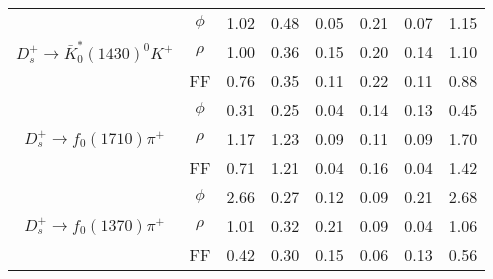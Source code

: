 \documentclass[aps,prd,twocolumn,showpacs,amsmath,amssymb]{revtex4-1}
\begin{document}
\begin{table*}[tp]
\begin{tabular}{cccccccc}
            \hline                                                                                                                                         
            \multirow{3}{*}{$D_{s}^{+} \rightarrow \bar{K}^{*}_{0}(1430)^{0}K^{+}$}     & $\phi$        &1.02      &0.48       &0.05   &0.21  &0.07  &1.15     \\
                                                                                        & $\rho$        &1.00      &0.36       &0.15   &0.20  &0.14  &1.10 \\
                                                                                        & FF            &0.76      &0.35       &0.11   &0.22  &0.11  &0.88 \\
            \hline                                                                                                                                         
            \multirow{3}{*}{$D_{s}^{+} \rightarrow f_{0}(1710)\pi^{+}$}                 & $\phi$        &0.31      &0.25       &0.04   &0.14  &0.13  &0.45 \\
                                                                                        & $\rho$        &1.17      &1.23       &0.09   &0.11  &0.09  &1.70 \\
                                                                                        & FF            &0.71      &1.21       &0.04   &0.16  &0.04  &1.42 \\
            \hline                                                                                                                                         
            \multirow{3}{*}{$D_{s}^{+} \rightarrow f_{0}(1370)\pi^{+}$}                 & $\phi$        &2.66      &0.27       &0.12   &0.09  &0.21  &2.68  \\
                                                                                        & $\rho$        &1.01      &0.32       &0.21   &0.09  &0.04  &1.06 \\
                                                                                        & FF            &0.42      &0.30       &0.15   &0.06  &0.13  &0.56 \\
            \hline\hline
        \end{tabular}  
    \end{table*}  
\end{document}
